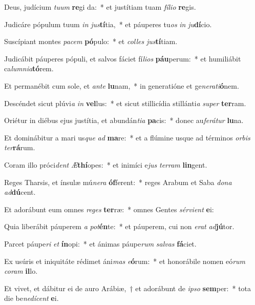 \item Deus, judícium \textit{tu}\textit{um} \textbf{re}gi da:~* et justítiam tuam \textit{fí}\textit{li}\textit{o} \textbf{re}gis.
\item Judicáre pópulum tuum \textit{in} \textit{jus}\textbf{tí}tia,~* et páuperes tu\textit{os} \textit{in} \textit{ju}\textbf{dí}cio.
\item Suscípiant montes \textit{pa}\textit{cem} \textbf{pó}pulo:~* et \textit{col}\textit{les} \textit{jus}\textbf{tí}tiam.
\item Judicábit páuperes pópuli, et salvos fáciet fí\textit{li}\textit{os} \textbf{páu}perum:~* et humiliábit ca\textit{lum}\textit{ni}\textit{a}\textbf{tó}rem.
\item Et permanébit cum sole, et \textit{an}\textit{te} \textbf{lu}nam,~* in generatióne et ge\textit{ne}\textit{ra}\textit{ti}\textbf{ó}nem.
\item Descéndet sicut plúvi\textit{a} \textit{in} \textbf{vel}lus:~* et sicut stillicídia stillánti\textit{a} \textit{su}\textit{per} \textbf{ter}ram.
\item Oriétur in diébus ejus justítia, et abundán\textit{ti}\textit{a} \textbf{pa}cis:~* donec au\textit{fe}\textit{rá}\textit{tur} \textbf{lu}na.
\item Et dominábitur a mari us\textit{que} \textit{ad} \textbf{ma}re:~* et a flúmine usque ad términos \textit{or}\textit{bis} \textit{ter}\textbf{rá}rum.
\item Coram illo próci\textit{dent} \textit{Æ}\textbf{thí}opes:~* et inimíci e\textit{jus} \textit{ter}\textit{ram} \textbf{lin}gent.
\item Reges Tharsis, et ínsulæ mú\textit{ne}\textit{ra} \textbf{óf}ferent:~* reges Arabum et Saba \textit{do}\textit{na} \textit{ad}\textbf{dú}cent.
\item Et adorábunt eum omnes \textit{re}\textit{ges} \textbf{ter}ræ:~* omnes Gentes \textit{sér}\textit{vi}\textit{ent} \textbf{e}i:
\item Quia liberábit páuperem \textit{a} \textit{pot}\textbf{én}te:~* et páuperem, cui non \textit{e}\textit{rat} \textit{ad}\textbf{jú}tor.
\item Parcet páupe\textit{ri} \textit{et} \textbf{ín}opi:~* et ánimas páupe\textit{rum} \textit{sal}\textit{vas} \textbf{fá}ciet.
\item Ex usúris et iniquitáte rédimet áni\textit{mas} \textit{e}\textbf{ó}rum:~* et honorábile nomen eó\textit{rum} \textit{co}\textit{ram} \textbf{il}lo.
\item Et vivet, et dábitur ei de auro Arábiæ,~† et adorábunt de \textit{ip}\textit{so} \textbf{sem}per:~* tota die be\textit{ne}\textit{dí}\textit{cent} \textbf{e}i.
